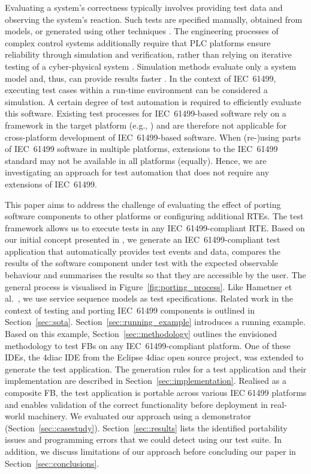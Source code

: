 \begin{bibunit}
Evaluating a system's correctness typically involves providing test data and observing the system's reaction. Such tests are specified manually, obtained from models, or generated using other techniques \cite{Sinha.2019}. The engineering processes of complex control systems additionally require that PLC platforms ensure reliability through simulation and verification, rather than relying on iterative testing of a cyber-physical system \cite{Sehr.2021}. Simulation methods evaluate only a system model and, thus, can provide results faster \cite{Sinha.2019}. In the context of IEC~61499, executing test cases within a run-time environment can be considered a simulation. A certain degree of test automation is required to efficiently evaluate this software. Existing test processes for IEC~61499-based software rely on a framework in the target platform (e.g., \cite{hametner2014}) and are therefore not applicable for cross-platform development of IEC~61499-based software. When (re-)using parts of IEC~61499 software in multiple platforms, extensions to the IEC~61499 standard may not be available in all platforms (equally). Hence, we are investigating an approach for test automation that does not require any extensions of IEC~61499.

This paper aims to address the challenge of evaluating the effect of porting software components to other platforms or configuring additional RTEs. The test framework allows us to execute tests in any IEC~61499-compliant RTE. Based on our initial concept presented in \cite{biancaMidhunETFAwip}, we generate an IEC~61499-compliant test application that automatically provides test events and data, compares the results of the software component under test with the expected observable behaviour and summarises the results so that they are accessible by the user. The general process is visualised in Figure~\ref{fig:porting_process}. 
Like Hametner et al.~\cite{hametner2014}, we use service sequence models as test specifications. Related work in the context of testing and porting IEC~61499 components is outlined in Section~\ref{sec::sota}. Section~\ref{sec::running_example} introduces a running example. Based on this example, Section~\ref{sec::methodology} outlines the envisioned methodology to test FBs on any IEC~61499-compliant platform. 
One of these IDEs, the 4diac IDE from the Eclipse 4diac open source project, was extended to generate the test application. 
The generation rules for a test application and their implementation are described in Section~\ref{sec::implementation}. Realised as a composite FB, the test application is portable across various IEC 61499 platforms and enables validation of the correct functionality before deployment in real-world machinery. We evaluated our approach using a demonstrator (Section~\ref{sec::casestudy}). Section~\ref{sec::results} lists the identified portability issues and programming errors that we could detect using our test suite. In addition, we discuss limitations of our approach before concluding our paper in Section~\ref{sec::conclusions}. 


\end{bibunit}
